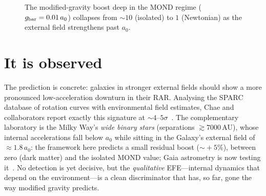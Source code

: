 \documentclass[aps,prd,twocolumn,10pt,nofootinbib]{revtex4-2}
\begin{document}
\begin{figure}[t]
\centering
{}
\caption{The modified-gravity boost deep in the MOND regime ($g_{\rm bar}=0.01\,a_0$) collapses from $\sim\!10$
(isolated) to $1$ (Newtonian) as the external field strengthens past $a_0$.}
\label{fig:boost}
\end{figure}

\section{It is observed}
The prediction is concrete: galaxies in stronger external fields should show a more pronounced low-acceleration
downturn in their RAR. Analysing the SPARC database of rotation curves with environmental field estimates, Chae
and collaborators report exactly this signature at $\sim\!4\text{--}5\sigma$~\cite{Chae2021}. The complementary
laboratory is the Milky Way's \emph{wide binary stars} (separations $\gtrsim\!7000\,$AU), whose internal
accelerations fall below $a_0$ while sitting in the Galaxy's external field of $\approx\!1.8\,a_0$: the framework
here predicts a small residual boost ($\sim\!+5\%$), between zero (dark matter) and the isolated MOND value;
Gaia astrometry is now testing it~\cite{Banik2024}. No detection is yet decisive, but the \emph{qualitative}
EFE---internal dynamics that depend on the environment---is a clean discriminator that has, so far, gone the way
modified gravity predicts.
\end{document}
